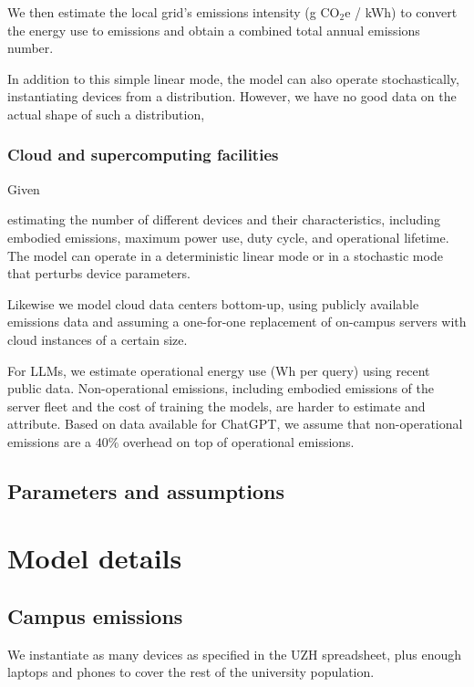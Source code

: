 \documentclass[11pt]{article}
\begin{document}
We then estimate the local grid's emissions intensity (g CO$_2$e / kWh) to convert the energy use to emissions and obtain a combined total annual emissions number.

In addition to this simple linear mode, the model can also operate stochastically, instantiating devices from a distribution. However, we have no good data on the actual shape of such a distribution, 

\subsubsection{Cloud and supercomputing facilities}

Given 



estimating the number of different devices and their characteristics, including embodied emissions, maximum power use, duty cycle, and operational lifetime. The model can operate in a deterministic linear mode or in a stochastic mode that perturbs device parameters.

Likewise we model cloud data centers bottom-up, using publicly available emissions data and assuming a one-for-one replacement of on-campus servers with cloud instances of a certain size.

For LLMs, we estimate operational energy use (Wh per query) using recent public data. Non-operational emissions, including embodied emissions of the server fleet and the cost of training the models, are harder to estimate and attribute. Based on data available for ChatGPT, we assume that non-operational emissions are a $40\%$ overhead on top of operational emissions.

\subsection{Parameters and assumptions}

\section{Model details}
\label{sec:model:details}

\subsection{Campus emissions}

We instantiate as many devices as specified in the UZH spreadsheet, plus enough laptops and phones
to cover the rest of the university population.
\end{document}
